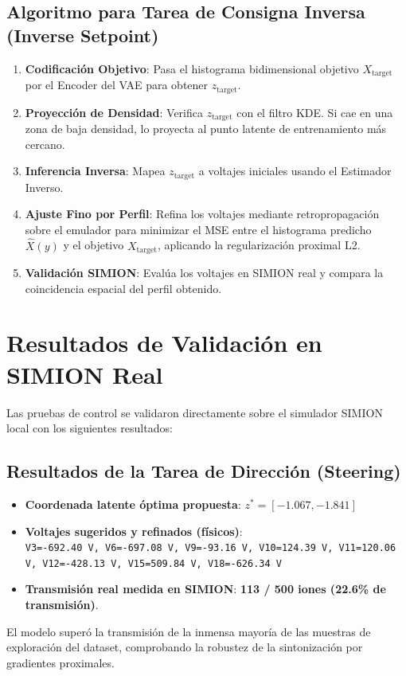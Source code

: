 \documentclass[12pt,letterpaper]{article}
\begin{document}
\subsection{Algoritmo para Tarea de Consigna Inversa (Inverse Setpoint)}
\begin{enumerate}
    \item \textbf{Codificación Objetivo}: Pasa el histograma bidimensional objetivo $X_{\text{target}}$ por el Encoder del VAE para obtener $z_{\text{target}}$.
    \item \textbf{Proyección de Densidad}: Verifica $z_{\text{target}}$ con el filtro KDE. Si cae en una zona de baja densidad, lo proyecta al punto latente de entrenamiento más cercano.
    \item \textbf{Inferencia Inversa}: Mapea $z_{\text{target}}$ a voltajes iniciales usando el Estimador Inverso.
    \item \textbf{Ajuste Fino por Perfil}: Refina los voltajes mediante retropropagación sobre el emulador para minimizar el MSE entre el histograma predicho $\hat{X}(y)$ y el objetivo $X_{\text{target}}$, aplicando la regularización proximal L2.
    \item \textbf{Validación SIMION}: Evalúa los voltajes en SIMION real y compara la coincidencia espacial del perfil obtenido.
\end{enumerate}

\section{Resultados de Validación en SIMION Real}
Las pruebas de control se validaron directamente sobre el simulador SIMION local con los siguientes resultados:

\subsection{Resultados de la Tarea de Dirección (Steering)}
\begin{itemize}
    \item \textbf{Coordenada latente óptima propuesta}: $z^* = [-1.067, -1.841]$
    \item \textbf{Voltajes sugeridos y refinados (físicos)}: \\
    \texttt{V3=-692.40 V, V6=-697.08 V, V9=-93.16 V, V10=124.39 V, V11=120.06 V, V12=-428.13 V, V15=509.84 V, V18=-626.34 V}
    \item \textbf{Transmisión real medida en SIMION}: \textbf{113 / 500 iones (22.6\% de transmisión)}.
\end{itemize}
El modelo superó la transmisión de la inmensa mayoría de las muestras de exploración del dataset, comprobando la robustez de la sintonización por gradientes proximales.
\end{document}
